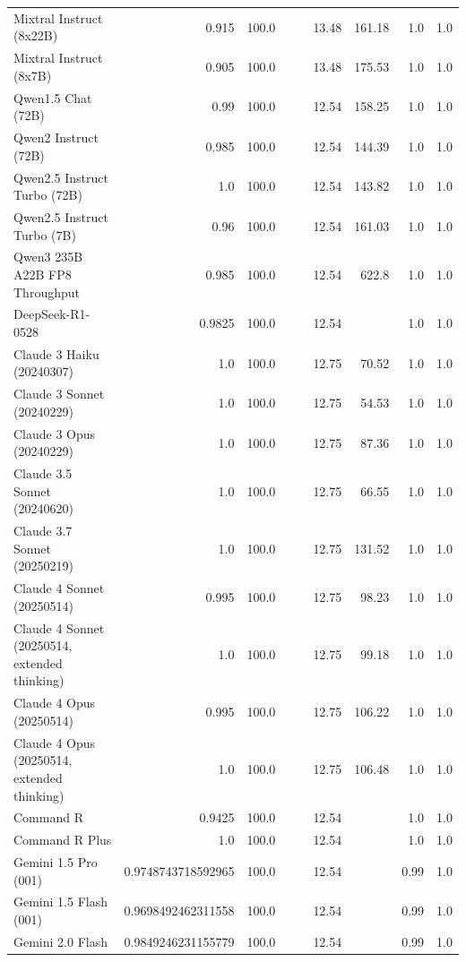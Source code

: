 \begin{table}[htp]
{\begin{tabular}{lrrrrrrrr}
Mixtral Instruct (8x22B) & 0.915 & 100.0 &  &  & 13.48 & 161.18 & 1.0 & 1.0 \\
Mixtral Instruct (8x7B) & 0.905 & 100.0 &  &  & 13.48 & 175.53 & 1.0 & 1.0 \\
Qwen1.5 Chat (72B) & 0.99 & 100.0 &  &  & 12.54 & 158.25 & 1.0 & 1.0 \\
Qwen2 Instruct (72B) & 0.985 & 100.0 &  &  & 12.54 & 144.39 & 1.0 & 1.0 \\
Qwen2.5 Instruct Turbo (72B) & 1.0 & 100.0 &  &  & 12.54 & 143.82 & 1.0 & 1.0 \\
Qwen2.5 Instruct Turbo (7B) & 0.96 & 100.0 &  &  & 12.54 & 161.03 & 1.0 & 1.0 \\
Qwen3 235B A22B FP8 Throughput & 0.985 & 100.0 &  &  & 12.54 & 622.8 & 1.0 & 1.0 \\
DeepSeek-R1-0528 & 0.9825 & 100.0 &  &  & 12.54 &  & 1.0 & 1.0 \\
Claude 3 Haiku (20240307) & 1.0 & 100.0 &  &  & 12.75 & 70.52 & 1.0 & 1.0 \\
Claude 3 Sonnet (20240229) & 1.0 & 100.0 &  &  & 12.75 & 54.53 & 1.0 & 1.0 \\
Claude 3 Opus (20240229) & 1.0 & 100.0 &  &  & 12.75 & 87.36 & 1.0 & 1.0 \\
Claude 3.5 Sonnet (20240620) & 1.0 & 100.0 &  &  & 12.75 & 66.55 & 1.0 & 1.0 \\
Claude 3.7 Sonnet (20250219) & 1.0 & 100.0 &  &  & 12.75 & 131.52 & 1.0 & 1.0 \\
Claude 4 Sonnet (20250514) & 0.995 & 100.0 &  &  & 12.75 & 98.23 & 1.0 & 1.0 \\
Claude 4 Sonnet (20250514, extended thinking) & 1.0 & 100.0 &  &  & 12.75 & 99.18 & 1.0 & 1.0 \\
Claude 4 Opus (20250514) & 0.995 & 100.0 &  &  & 12.75 & 106.22 & 1.0 & 1.0 \\
Claude 4 Opus (20250514, extended thinking) & 1.0 & 100.0 &  &  & 12.75 & 106.48 & 1.0 & 1.0 \\
Command R & 0.9425 & 100.0 &  &  & 12.54 &  & 1.0 & 1.0 \\
Command R Plus & 1.0 & 100.0 &  &  & 12.54 &  & 1.0 & 1.0 \\
Gemini 1.5 Pro (001) & 0.9748743718592965 & 100.0 &  &  & 12.54 &  & 0.99 & 1.0 \\
Gemini 1.5 Flash (001) & 0.9698492462311558 & 100.0 &  &  & 12.54 &  & 0.99 & 1.0 \\
Gemini 2.0 Flash & 0.9849246231155779 & 100.0 &  &  & 12.54 &  & 0.99 & 1.0 \\

\end{tabular}}
\end{table}
